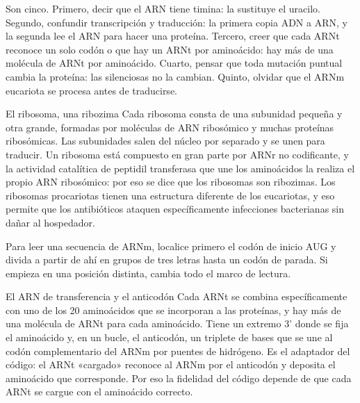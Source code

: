 \documentclass{book}
\begin{document}
Son cinco. Primero, decir que el ARN tiene timina: la sustituye el uracilo. Segundo, confundir transcripción y traducción: la primera copia ADN a ARN, y la segunda lee el ARN para hacer una proteína. Tercero, creer que cada ARNt reconoce un solo codón o que hay un ARNt por aminoácido: hay más de una molécula de ARNt por aminoácido. Cuarto, pensar que toda mutación puntual cambia la proteína: las silenciosas no la cambian. Quinto, olvidar que el ARNm eucariota se procesa antes de traducirse.


\begin{tcolorbox}[title={Consejo}, studiumtip, breakable]

El ribosoma, una ribozima
Cada ribosoma consta de una subunidad pequeña y otra grande, formadas por moléculas de ARN ribosómico y muchas proteínas ribosómicas. Las subunidades salen del núcleo por separado y se unen para traducir. Un ribosoma está compuesto en gran parte por ARNr no codificante, y la actividad catalítica de peptidil transferasa que une los aminoácidos la realiza el propio ARN ribosómico: por eso se dice que los ribosomas son ribozimas. Los ribosomas procariotas tienen una estructura diferente de los eucariotas, y eso permite que los antibióticos ataquen específicamente infecciones bacterianas sin dañar al hospedador.


Para leer una secuencia de ARNm, localice primero el codón de inicio AUG y divida a partir de ahí en grupos de tres letras hasta un codón de parada. Si empieza en una posición distinta, cambia todo el marco de lectura.

\end{tcolorbox}

\begin{tcolorbox}[title={Definición}, studiumdef, breakable]

El ARN de transferencia y el anticodón
Cada ARNt se combina específicamente con uno de los 20 aminoácidos que se incorporan a las proteínas, y hay más de una molécula de ARNt para cada aminoácido. Tiene un extremo 3' donde se fija el aminoácido y, en un bucle, el anticodón, un triplete de bases que se une al codón complementario del ARNm por puentes de hidrógeno. Es el adaptador del código: el ARNt «cargado» reconoce al ARNm por el anticodón y deposita el aminoácido que corresponde. Por eso la fidelidad del código depende de que cada ARNt se cargue con el aminoácido correcto.

\end{tcolorbox}
\end{document}
